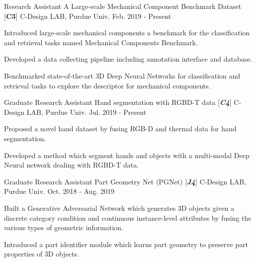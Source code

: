 

\begin{cventries}

\cventry
{Research Assistant} %
{A Large-scale Mechanical Component Benchmark Dataset [\textbf{C3}]} %
{C-Design LAB, Purdue Univ.} %
{Feb. 2019 - Present} %
{ %
\begin{cvitems}
\item {Introduced large-scale mechanical components a benchmark for the classification and retrieval tasks named Mechanical Components Benchmark.}
\item {Developed a data collecting pipeline including annotation interface and database.}
\item {Benchmarked state-of-the-art 3D Deep Neural Networks for classification and retrieval tasks to explore the descriptor for mechanical components.}
\end{cvitems}
}

\cventry
{Graduate Research Assistant} %
{Hand segmentation with RGBD-T data [\textit{\textbf{C4}}]} %
{C-Design LAB, Purdue Univ.} %
{Jul. 2019 - Present} %
{ %
\begin{cvitems}
\item {Proposed a novel hand dataset by fusing RGB-D and thermal data for hand segmentation.}
\item {Developed a method which segment hands and objects with a multi-modal Deep Neural network dealing with RGBD-T data.}
\end{cvitems}
}


\cventry
{Graduate Research Assistant} %
{Part Geometry Net (PGNet) [\textit{\textbf{J4}}]} %
{C-Design LAB, Purdue Univ.} %
{Oct. 2018 - Aug. 2019} %
{ %
\begin{cvitems}
\item {Built a Generative Adversarial Network which generates 3D objects given a discrete category condition and continuous instance-level attributes by fusing the various types of geometric information.}
\item {Introduced a part identifier module which learns part geometry to preserve part properties of 3D objects.}
\end{cvitems}
}


\end{cventries}
